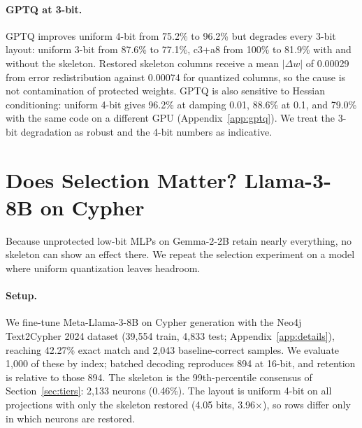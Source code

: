\documentclass[11pt]{article}
\begin{document}
\paragraph{GPTQ at 3-bit.}
GPTQ improves uniform 4-bit from 75.2\% to 96.2\% but degrades 
every 3-bit layout: uniform 3-bit from 87.6\% to 77.1\%, c3+a8 
from 100\% to 81.9\% with and without the skeleton. Restored 
skeleton columns receive a mean $|\Delta w|$ of 0.00029 from 
error redistribution against 0.00074 for quantized columns, so 
the cause is not contamination of protected weights. GPTQ is 
also sensitive to Hessian conditioning: uniform 4-bit gives 
96.2\% at damping 0.01, 88.6\% at 0.1, and 79.0\% with the same 
code on a different GPU (Appendix~\ref{app:gptq}). We treat the 
3-bit degradation as robust and the 4-bit numbers as indicative.
\section{Does Selection Matter? Llama-3-8B on Cypher}
\label{sec:llama}

Because unprotected low-bit MLPs on Gemma-2-2B retain nearly 
everything, no skeleton can show an effect there. We repeat the 
selection experiment on a model where uniform quantization 
leaves headroom.

\paragraph{Setup.}
We fine-tune Meta-Llama-3-8B 
\cite{grattafiori2024llama3herdmodels} on Cypher generation 
with the Neo4j Text2Cypher 2024 dataset 
\cite{ozsoy2024text2cypherbridgingnaturallanguage} (39,554 
train, 4,833 test; Appendix~\ref{app:details}), reaching 
42.27\% exact match and 2,043 baseline-correct samples. We 
evaluate 1,000 of these by index; batched decoding reproduces 
894 at 16-bit, and retention is relative to those 894. The 
skeleton is the 99th-percentile consensus of 
Section~\ref{sec:tiers}: 2,133 neurons (0.46\%). The layout is 
uniform 4-bit on all projections with only the skeleton 
restored (4.05 bits, 3.96$\times$), so rows differ only in 
which neurons are restored.
\end{document}
